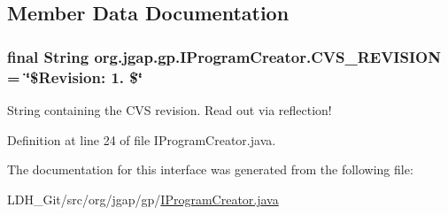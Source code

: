 \subsection{Member Data Documentation}
\hypertarget{interfaceorg_1_1jgap_1_1gp_1_1_i_program_creator_a9234470aef85eb0c69ae64455fd98dd2}{
\subsubsection[{C\-V\-S\-\_\-\-R\-E\-V\-I\-S\-I\-O\-N}]{\setlength{\rightskip}{0pt plus 5cm}final String org.\-jgap.\-gp.\-I\-Program\-Creator.\-C\-V\-S\-\_\-\-R\-E\-V\-I\-S\-I\-O\-N = \char`\"{}\$Revision\-: 1. \$\char`\"{}\hspace{0.3cm}{\ttfamily [static]}}}\label{interfaceorg_1_1jgap_1_1gp_1_1_i_program_creator_a9234470aef85eb0c69ae64455fd98dd2}
String containing the C\-V\-S revision. Read out via reflection! 

Definition at line 24 of file I\-Program\-Creator.\-java.



The documentation for this interface was generated from the following file\-:\begin{DoxyCompactItemize}
\item 
L\-D\-H\-\_\-\-Git/src/org/jgap/gp/\hyperlink{_i_program_creator_8java}{I\-Program\-Creator.\-java}\end{DoxyCompactItemize}

